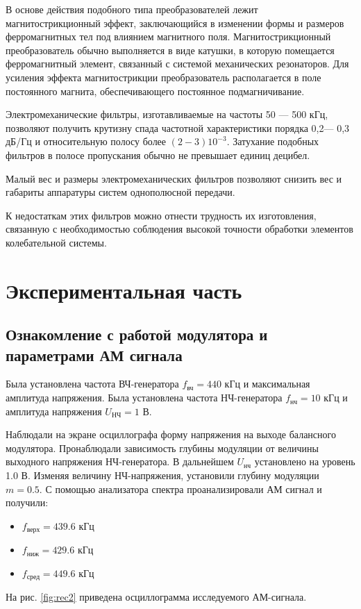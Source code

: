 В основе действия подобного типа преобразователей лежит магнитострикционный эффект, заключающийся в изменении формы и размеров ферромагнитных тел под влиянием магнитного поля. Магнитострикционный преобразователь обычно выполняется в виде катушки, в которую помещается ферромагнитный элемент, связанный с системой механических резонаторов. Для усиления эффекта магнитострикции преобразователь располагается в поле постоянного магнита, обеспечивающего постоянное подмагничивание.

Электромеханические фильтры, изготавливаемые на частоты 50 — 500 кГц, позволяют получить крутизну спада частотной характеристики порядка 0,2— 0,3 дБ/Гц и относительную полосу более $(2 - 3) 10^{-3}$. Затухание подобных
фильтров в полосе пропускания обычно не превышает единиц децибел.

Малый вес и размеры электромеханических фильтров позволяют снизить
вес и габариты аппаратуры систем однополюсной передачи. 

К недостаткам этих фильтров можно отнести трудность их изготовления, связанную с необходимостью соблюдения высокой точности обработки элементов колебательной системы.
\section{Экспериментальная часть}

\subsection{Ознакомление с работой модулятора и параметрами АМ сигнала}

Была установлена частота ВЧ-генератора $f_{\text{вч}}=440$ кГц и максимальная амплитуда напряжения.
Была установлена частота НЧ-генератора $f_{\text{нч}}=10$ кГц и  амплитуда напряжения 
$U_{\text{НЧ}} = 1 $ В.



Наблюдали на экране осциллографа форму напряжения на выходе балансного модулятора. Пронаблюдали зависимость глубины модуляции от величины выходного напряжения НЧ-генератора.
В дальнейшем $U_{\text{нч}}$ установлено на уровень 1.0 В. Изменяя величину НЧ-напряжения, установили глубину модуляции $m=0.5$. С помощью анализатора спектра проанализировали АМ сигнал и получили:

\begin{itemize}
	\item $f_{\text{верх}}=439.6$ кГц
	\item $f_{\text{ниж}}=429.6$ кГц
	\item $f_{\text{сред}}=449.6$ кГц
\end{itemize}
На рис. \ref{fig:rec2} приведена осциллограмма исследуемого АМ-сигнала.

